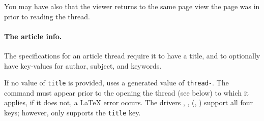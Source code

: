 \documentclass{article}
\begin{document}
You may have also that the viewer returns to the same page view the page was
in prior to reading the thread.

\paragraph*{The article info.} The specifications for an article thread require
it to have a title, and to optionally have key-values for author, subject, and keywords.
\bVerb{}%
\begin{dCmd}[commandchars=!()]{\bxSize}
\end{dCmd}
\endgroup\noindent If no value of \texttt{title} is provided,  uses
a generated value of \texttt{thread-}. The 
command must appear prior to the opening the thread (see  below)
to which it applies, if it does not, a {\LaTeX} error occurs. The drivers
, ,  (, )
support all four keys; however,  only supports the \texttt{title}
key.
\end{document}

